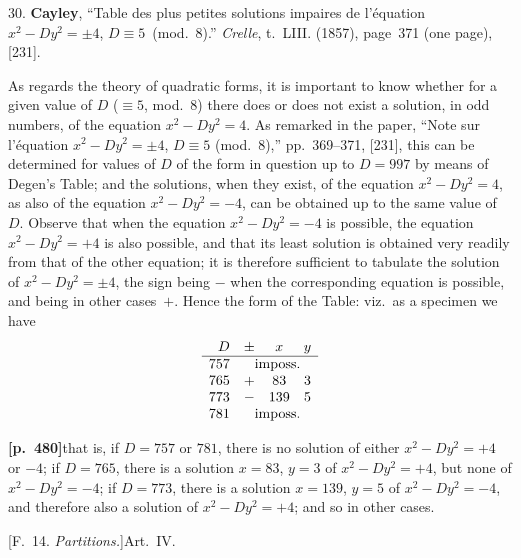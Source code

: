 \documentclass[11pt,a4paper]{article}
\begin{document}
30. \textbf{Cayley}, ``Table des plus petites solutions impaires de l'\'equation $x^{2} - Dy^{2} = \pm 4$, $D \equiv 5$~(mod.~8).'' \textit{Crelle}, t.~LIII. (1857), page~371 (one page), [231].

As regards the theory of quadratic forms, it is important to know whether for a given value of $D$ ($\equiv 5$, mod.~8) there does or does not exist a solution, in odd numbers, of the equation $x^{2} - Dy^{2} = 4$. As remarked in the paper, ``Note sur l'\'equation $x^{2} - Dy^{2} = \pm 4$, $D \equiv 5$ (mod.~8),'' pp.~369--371, [231], this can be determined for values of $D$ of the form in question up to $D = 997$ by means of Degen's Table; and the solutions, when they exist, of the equation $x^{2} - Dy^{2} = 4$, as also of the equation $x^{2} - Dy^{2} = -4$, can be obtained up to the same value of $D$. Observe that when the equation $x^{2} - Dy^{2} = -4$ is possible, the equation $x^{2} - Dy^{2} = +4$ is also possible, and that its least solution is obtained very readily from that of the other equation; it is therefore sufficient to tabulate the solution of $x^{2} - Dy^{2} = \pm 4$, the sign being $-$ when the corresponding equation is possible, and being in other cases~$+$. Hence the form of the Table: viz.\ as a specimen we have
\[
\begin{array}{rccc}
D & \pm & x & y \\
\hline
757 & \multicolumn{3}{c}{\text{imposs.}} \\
765 & + & 83 & 3 \\
773 & - & 139 & 5 \\
781 & \multicolumn{3}{c}{\text{imposs.}}
\end{array}
\]

\noindent\textbf{[p.~480]}\quad that is, if $D = 757$ or $781$, there is no solution of either $x^{2} - Dy^{2} = +4$ or $-4$; if $D = 765$, there is a solution $x = 83$, $y = 3$ of $x^{2} - Dy^{2} = +4$, but none of $x^{2} - Dy^{2} = -4$; if $D = 773$, there is a solution $x = 139$, $y = 5$ of $x^{2} - Dy^{2} = -4$, and therefore also a solution of $x^{2} - Dy^{2} = +4$; and so in other cases.

\bigskip
\begin{center}
[F.~14. \textit{Partitions.}]\quad Art.~IV.
\end{center}
\end{document}
